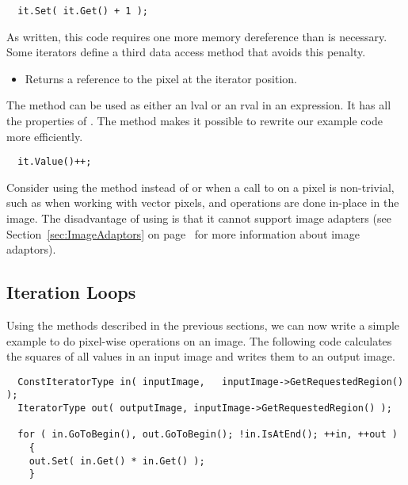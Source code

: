 \small
\begin{verbatim}
  it.Set( it.Get() + 1 );
\end{verbatim}
\normalsize

As written, this code requires one more memory dereference than is necessary.
Some iterators define a third data access method that avoids this penalty.

\begin{itemize}
\item \textbf{} Returns a reference to the pixel at
the iterator position.
\end{itemize}

The  method can be used as either an lval or an rval in an
expression.  It has all the properties of .  The
 method makes it possible to rewrite our example code more
efficiently.

\small
\begin{verbatim}
  it.Value()++;
\end{verbatim}
\normalsize

Consider using the  method instead of  or
 when a call to  on a pixel is non-trivial, such as
when working with vector pixels, and operations are done in-place in the
image. The disadvantage of using  is that it cannot support image
adapters (see Section~\ref{sec:ImageAdaptors} on
page~\pageref{sec:ImageAdaptors} for more information about image adaptors).

\subsection{Iteration Loops}
\label{sec:IterationExample}
Using the methods described in the previous sections, we can now write a simple
example to do pixel-wise operations on an image.  The following code calculates
the squares of all values in an input image and writes them to an output image.

\small
\begin{verbatim}
  ConstIteratorType in( inputImage,   inputImage->GetRequestedRegion() );
  IteratorType out( outputImage, inputImage->GetRequestedRegion() );

  for ( in.GoToBegin(), out.GoToBegin(); !in.IsAtEnd(); ++in, ++out )
    {
    out.Set( in.Get() * in.Get() );
    }
\end{verbatim}
\normalsize


